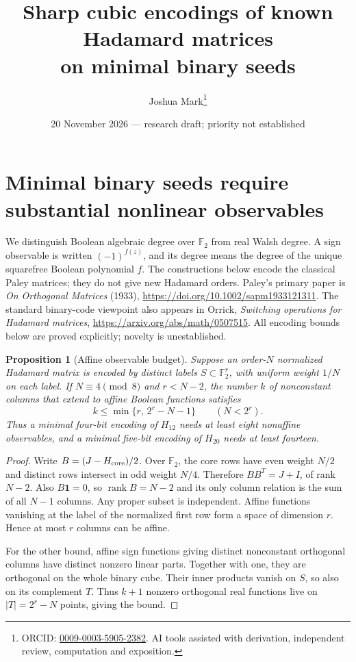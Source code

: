 \documentclass[11pt]{article}
\title{Sharp cubic encodings of known Hadamard matrices\\on minimal binary seeds}
\author{Joshua Mark\thanks{ORCID: \href{https://orcid.org/0009-0003-5905-2382}{0009-0003-5905-2382}. AI tools assisted with derivation, independent review, computation and exposition.}}
\date{20 November 2026 --- research draft; priority not established}
\newtheorem{proposition}[theorem]{Proposition}
\begin{document}
\maketitle
\section{Minimal binary seeds require substantial nonlinear observables}
\label{sec:nonlinear-seeds}
We distinguish Boolean algebraic degree over $\mathbb F_2$ from real
Walsh degree. A sign observable is written $(-1)^{f(z)}$, and its degree
means the degree of the unique squarefree Boolean polynomial $f$.
The constructions below encode the classical Paley matrices; they do
not give new Hadamard orders. Paley's primary paper is
\emph{On Orthogonal Matrices} (1933),
\url{https://doi.org/10.1002/sapm1933121311}. The standard binary-code
viewpoint also appears in Orrick, \emph{Switching operations for Hadamard
matrices}, \url{https://arxiv.org/abs/math/0507515}.
All encoding bounds below are proved explicitly; novelty is unestablished.

\begin{proposition}[Affine observable budget]
\label{prop:nonlinear-affine-budget}
Suppose an order-$N$ normalized Hadamard matrix is encoded by distinct
labels $S\subset\mathbb F_2^r$, with uniform weight $1/N$ on each label.
If $N\equiv4\pmod8$ and $r<N-2$, the number $k$ of nonconstant columns
that extend to affine Boolean functions satisfies
\[
 k\le\min\{r,\,2^r-N-1\}\qquad(N<2^r).
\]
Thus a minimal four-bit encoding of $H_{12}$ needs at least eight
nonaffine observables, and a minimal five-bit encoding of $H_{20}$
needs at least fourteen.
\end{proposition}
\begin{proof}
Write $B=(J-H_{\rm core})/2$. Over $\mathbb F_2$, the core rows have
even weight $N/2$ and distinct rows intersect in odd weight $N/4$.
Therefore $BB^T=J+I$, of rank $N-2$. Also $B\mathbf1=0$, so
$\operatorname{rank}B=N-2$ and its only column relation is the sum
of all $N-1$ columns. Any proper subset is independent. Affine functions
vanishing at the label of the normalized first row form a space of
dimension $r$. Hence at most $r$ columns can be affine.

For the other bound, affine sign functions giving distinct nonconstant
orthogonal columns have distinct nonzero linear parts. Together with
one, they are orthogonal on the whole binary cube. Their inner products
vanish on $S$, so also on its complement $T$. Thus $k+1$ nonzero
orthogonal real functions live on $|T|=2^r-N$ points, giving the bound.
\end{proof}
\end{document}
